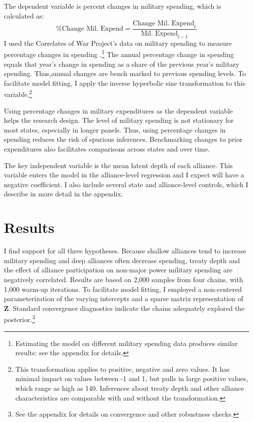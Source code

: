 \documentclass[12pt]{article}
\begin{document}
The dependent variable is percent changes in military spending, which is calculated as:
\begin{equation}
\mbox{\% Change Mil. Expend} = \frac{ \mbox{Change Mil. Expend}_t }{ \mbox{Mil. Expend}_{t-1} }
\end{equation} 
I used the Correlates of War Project's data on military spending to measure percentage changes in spending \citep{SingerCINC1988}.\footnote{Estimating the model on different military spending data produces similar results: see the appendix for details.} 
The annual percentage change in spending equals that year's change in spending as a share of the previous year's military spending.
Thus,annual changes are bench marked to previous spending levels. 
To facilitate model fitting, I apply the inverse hyperbolic sine transformation to this variable.\footnote{This transformation applies to positive, negative and zero values. It has minimal impact on values between -1 and 1, but pulls in large positive values, which range as high as 140. Inferences about treaty depth and other alliance characteristics are comparable with and without the transformation.}


Using percentage changes in military expenditures as the dependent variable helps the research design. 
The level of military spending is not stationary for most states, especially in longer panels. 
Thus, using percentage changes in spending reduces the risk of spurious inferences.
Benchmarking changes to prior expenditures also facilitates comparisons across states and over time. 


The key independent variable is the mean latent depth of each alliance. 
This variable enters the model in the alliance-level regression and I expect will have a negative coefficient. 
I also include several state and alliance-level controls, which I describe in more detail in the appendix. 

 

\section{Results}


I find support for all three hypotheses. 
Because shallow alliances tend to increase military spending and deep alliances often decrease spending, treaty depth and the effect of alliance participation on non-major power military spending are negatively correlated. 
Results are based on 2,000 samples from four chains, with 1,000 warm-up iterations. 
To facilitate model fitting, I employed a non-centered parameterization of the varying intercepts and a sparse matrix representation of \textbf{Z}. 
Standard convergence diagnostics indicate the chains adequately explored the posterior.\footnote{See the appendix for details on convergence and other robustness checks.} 
\end{document}
